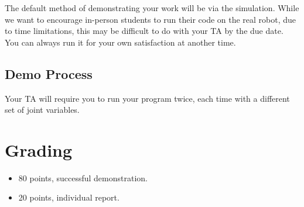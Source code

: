 The default method of demonstrating your work will be via the simulation.  While we want to encourage in-person students to run their code on the real robot, due to time limitations, this may be difficult to do with your TA by the due date.  You can always run it for your own satisfaction at another time.
\subsection{Demo Process}
Your TA will require you to run your program twice, each time with a different set of joint variables.


\section{Grading}
\begin{itemize}
\item 80 points, successful demonstration.
\item 20 points, individual report.  
\end{itemize}




